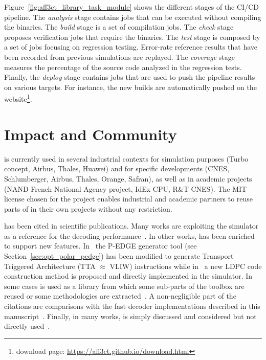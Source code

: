 Figure~\ref{fig:aff3ct_library_task_module} shows the different stages of the
\AFFECT CI/CD pipeline. The \emph{analysis} stage contains jobs that can be
executed without compiling the \AFFECT binaries. The \emph{build} stage is a set
of compilation jobs. The \emph{check} stage proposes verification jobs that
require the \AFFECT binaries. The \emph{test} stage is composed by a set of jobs
focusing on regression testing. Error-rate reference results that have been
recorded from previous simulations are replayed. The \emph{coverage} stage
measures the percentage of the \AFFECT source code analyzed in the regression
tests. Finally, the \emph{deploy} stage contains jobs that are used to push the
pipeline results on various targets. For instance, the new builds are
automatically pushed on the \AFFECT website\footnote{\AFFECT download page:
\url{https://aff3ct.github.io/download.html}}.

\section{Impact and Community}
\label{sec:aff3ct_impact}

\AFFECT is currently used in several industrial contexts for simulation purposes
(Turbo concept, Airbus, Thales, Huawei) and for specific developments (CNES,
Schlumberger, Airbus, Thales, Orange, Safran), as well as in academic projects
(NAND French National Agency project, IdEx CPU, R\&T CNES). The MIT license
chosen for the project enables industrial and academic partners to reuse parts
of \AFFECT in their own projects without any restriction.

\AFFECT has been cited in scientific publications. Many works are exploiting the
\AFFECT simulator as a reference for the decoding performance~\cite{Pignoly2018,
Poulenard2018,Ghanaatian2018,Wang2019,Hsieh2020,Rush2020,Duffy2020}. In other
works, \AFFECT has been enriched to support new features.
In~\cite{Leonardon2018b} the P-EDGE generator tool (see
Section~\ref{sec:opt_polar_pedge}) has been modified to generate Transport
Triggered Architecture (TTA $\approx$ VLIW) instructions while
in~\cite{Tasdighi2020} a new LDPC code construction method is proposed and
directly implemented in the \AFFECT simulator. In some cases \AFFECT is used as
a library from which some sub-parts of the toolbox are reused or some
methodologies are extracted~\cite{Florian2018,Lemaitre2018,Cavatassi2019a,
Cavatassi2019b,Ercan2020}. A non-negligible part of the citations are
comparisons with the fast decoder implementations described in this
manuscript~\cite{Zeng2017,Leonardon2018a,Guermouche2019,LeGal2019a,Shen2020}.
Finally, in many works, \AFFECT is simply discussed and considered but not
directly used~\cite{Debbabi2016,Debbabi2016a,Ercan2017,Natarajan2018,Cenova2019,
Krainyk2019,Vameghestahbanati2019,Mohammed2019,Shaheen2019,Aly2019,
Delomier2020}.

